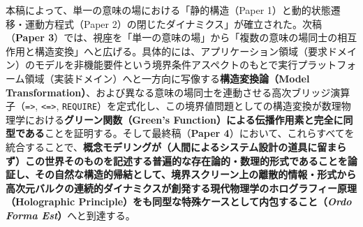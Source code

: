 \documentclass[11pt,a4paper]{ltjsarticle}
\theoremstyle{definition}
\theoremstyle{plain}
\theoremstyle{remark}
\begin{document}
本稿によって、単一の意味の場における「静的構造（Paper 1）と動的状態遷移・運動方程式（Paper 2）の閉じたダイナミクス」が確立された。次稿（\textbf{Paper 3}）では、視座を「単一の意味の場」から「複数の意味の場同士の相互作用と構造変換」へと広げる。具体的には、アプリケーション領域（要求ドメイン）のモデルを非機能要件という境界条件アスペクトのもとで実行プラットフォーム領域（実装ドメイン）へと一方向に写像する\textbf{構造変換論（Model Transformation）}、および異なる意味の場同士を連動させる高次ブリッジ演算子（\texttt{=>}, \texttt{<=>}, \texttt{REQUIRE}）を定式化し、この境界値問題としての構造変換が数理物理学における\textbf{グリーン関数（Green's Function）による伝播作用素と完全に同型である}ことを証明する。そして最終稿（\textbf{Paper 4}）において、これらすべてを統合することで、\textbf{概念モデリングが（人間によるシステム設計の道具に留まらず）この世界そのものを記述する普遍的な存在論的・数理的形式であることを論証し、その自然な構造的帰結として、境界スクリーン上の離散的情報・形式から高次元バルクの連続的ダイナミクスが創発する現代物理学のホログラフィー原理（Holographic Principle）をも同型な特殊ケースとして内包すること（\emph{Ordo Forma Est}）}へと到達する。
\end{document}
